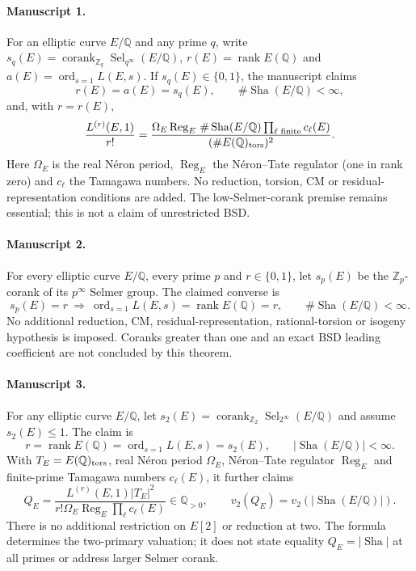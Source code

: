 \documentclass[11pt]{article}
\begin{document}
\paragraph{Manuscript 1.}
For an elliptic curve $E/\mathbb Q$ and any prime $q$, write $s_q(E)=\operatorname{corank}_{\mathbb Z_q}\operatorname{Sel}_{q^{\infty}}(E/\mathbb Q)$, $r(E)=\operatorname{rank}E(\mathbb Q)$ and $a(E)=\operatorname{ord}_{s=1}L(E,s)$. If $s_q(E)\in\{0,1\}$, the manuscript claims
\[
 r(E)=a(E)=s_q(E),\qquad\#\operatorname{Sha}(E/\mathbb Q)<\infty,
\]
and, with $r=r(E)$,
\[
 \frac{L^{(r)}(E,1)}{r!}
 =\frac{\Omega_E\operatorname{Reg}_E\,\#\operatorname{Sha}(E/\mathbb Q)\prod_{\ell\text{ finite}}c_{\ell}(E)}
 {(\#E(\mathbb Q)_{\rm tors})^2}.
\]
Here $\Omega_E$ is the real N\'eron period, $\operatorname{Reg}_E$ the N\'eron--Tate regulator (one in rank zero) and $c_{\ell}$ the Tamagawa numbers. No reduction, torsion, CM or residual-representation conditions are added. The low-Selmer-corank premise remains essential; this is not a claim of unrestricted BSD.

\paragraph{Manuscript 2.}
For every elliptic curve $E/\mathbb Q$, every prime $p$ and $r\in\{0,1\}$, let $s_p(E)$ be the $\mathbb Z_p$-corank of its $p^{\infty}$ Selmer group. The claimed converse is
\[
 s_p(E)=r\ \Longrightarrow\ \operatorname{ord}_{s=1}L(E,s)=\operatorname{rank}E(\mathbb Q)=r,
 \qquad\#\operatorname{Sha}(E/\mathbb Q)<\infty.
\]
No additional reduction, CM, residual-representation, rational-torsion or isogeny hypothesis is imposed. Coranks greater than one and an exact BSD leading coefficient are not concluded by this theorem.

\paragraph{Manuscript 3.}
For any elliptic curve $E/\mathbb Q$, let $s_2(E)=\operatorname{corank}_{\mathbb Z_2}\operatorname{Sel}_{2^{\infty}}(E/\mathbb Q)$ and assume $s_2(E)\le1$. The claim is
\[
 r=\operatorname{rank}E(\mathbb Q)=\operatorname{ord}_{s=1}L(E,s)=s_2(E),
 \qquad |\operatorname{Sha}(E/\mathbb Q)|<\infty.
\]
With $T_E=E(\mathbb Q)_{\rm tors}$, real N\'eron period $\Omega_E$, N\'eron--Tate regulator $\operatorname{Reg}_E$ and finite-prime Tamagawa numbers $c_{\ell}(E)$, it further claims
\[
 Q_E=\frac{L^{(r)}(E,1)|T_E|^2}{r!\Omega_E\operatorname{Reg}_E\prod_{\ell} c_{\ell}(E)}
 \in\mathbb Q_{>0},\qquad v_2(Q_E)=v_2(|\operatorname{Sha}(E/\mathbb Q)|).
\]
There is no additional restriction on $E[2]$ or reduction at two. The formula determines the two-primary valuation; it does not state equality $Q_E=|\operatorname{Sha}|$ at all primes or address larger Selmer corank.
\end{document}
